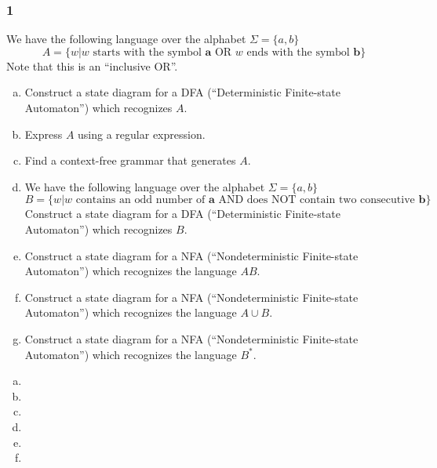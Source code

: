 \documentclass[../main.tex]{subfiles}
\begin{document}
\subsubsection*{1\hfill}
We have the following language over the alphabet $\Sigma = \{a, b\}$
\begin{equation*}
	A = \{w | w \text{ starts with the symbol } \mathbf{a} \text{ OR $w$ ends with the symbol } \mathbf{b}\}
\end{equation*}
Note that this is an ``inclusive OR''.
\begin{enumerate}[a)]
	\item Construct a state diagram for a DFA (``Deterministic Finite-state Automaton'') which recognizes $A$.
	\item Express $A$ using a regular expression.
	\item Find a context-free grammar that generates $A$.
	\item We have the following language over the alphabet $\Sigma = \{a, b\}$
		\begin{equation*}
			B = \{w | w \text{ contains an odd number of } \mathbf{a} \text{ AND does NOT contain two consecutive } \mathbf{b}\}
		\end{equation*}
		Construct a state diagram for a DFA (``Deterministic Finite-state Automaton'') which recognizes $B$.
	\item Construct a state diagram for a NFA (``Nondeterministic Finite-state Automaton'') which recognizes the language $AB$.
	\item Construct a state diagram for a NFA (``Nondeterministic Finite-state Automaton'') which recognizes the language $A \cup B$.
	\item Construct a state diagram for a NFA (``Nondeterministic Finite-state Automaton'') which recognizes the language $B^\ast$.
\end{enumerate}

\solution
\begin{enumerate}[a)]
	\item 
	\item 
	\item 
	\item 
	\item 
	\item 
\end{enumerate}
\end{document}
